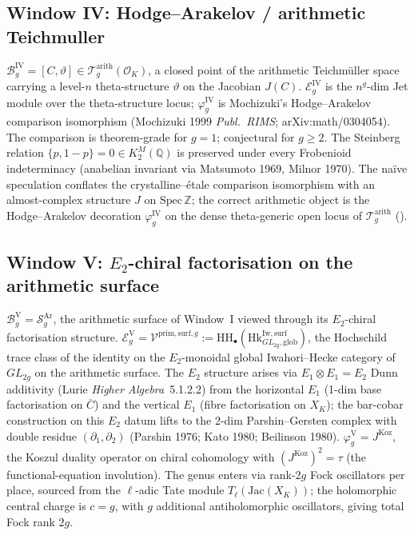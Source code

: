 \subsection{Window IV: Hodge--Arakelov / arithmetic Teichmuller}
\label{v4-arith:ag:w4-mochizuki}

\(\mathcal{B}_g^{\mathrm{IV}}=[C,\vartheta]\in\mathcal{T}_g^{\mathrm{arith}}(\mathcal{O}_K)\),
a closed point of the arithmetic Teichmüller space carrying a level-\(n\)
theta-structure \(\vartheta\) on the Jacobian \(J(C)\). \(\mathcal{E}_g^{\mathrm{IV}}\)
is the \(n^g\)-dim Jet module over the theta-structure locus;
\(\varphi_g^{\mathrm{IV}}\) is Mochizuki's Hodge--Arakelov comparison
isomorphism (Mochizuki 1999 \emph{Publ.~RIMS}; arXiv:math/0304054). The
comparison is theorem-grade for \(g=1\); conjectural for \(g\geq 2\). The
Steinberg relation \(\{p,1-p\}=0\in K_2^M(\mathbb{Q})\) is preserved under
every Frobenioid indeterminacy (anabelian invariant via
Matsumoto 1969, Milnor 1970). The na\"ive speculation conflates the crystalline--\'etale comparison
isomorphism with an almost-complex structure \(J\) on
\(\mathrm{Spec}\,\mathbb{Z}\); the correct arithmetic object is the
Hodge--Arakelov decoration \(\varphi_g^{\mathrm{IV}}\) on the dense
theta-generic open locus of \(\mathcal{T}_g^{\mathrm{arith}}\)
().

\subsection{Window V: \(E_2\)-chiral factorisation on the arithmetic surface}
\label{v4-arith:ag:w5-bar-cobar}

\(\mathcal{B}_g^{\mathrm{V}}=\mathcal{S}_g^{\mathrm{Ar}}\), the arithmetic
surface of Window~I viewed through its \(E_2\)-chiral factorisation
structure. \(\mathcal{E}_g^{\mathrm{V}}=\mathcal{V}^{\mathrm{prim,surf},g}:=
\mathrm{HH}_\bullet(\mathrm{Hk}^{\mathrm{Iw,surf}}_{GL_{2g},\mathrm{glob}})\),
the Hochschild trace class of the identity on the \(E_2\)-monoidal global
Iwahori--Hecke category of \(GL_{2g}\) on the arithmetic surface. The \(E_2\)
structure arises via \(E_1\otimes E_1=E_2\) Dunn additivity (Lurie
\emph{Higher Algebra}~5.1.2.2) from the horizontal \(E_1\) (1-dim base
factorisation on \(\overline{C}\)) and the vertical \(E_1\) (fibre
factorisation on \(X_K\)); the bar-cobar construction on this \(E_2\) datum
lifts to the 2-dim Parshin--Gersten complex with double residue
\((\partial_1,\partial_2)\) (Parshin 1976; Kato 1980; Beilinson 1980).
\(\varphi_g^{\mathrm{V}}=J^{\mathrm{Koz}}\), the Koszul duality operator
on chiral cohomology with \((J^{\mathrm{Koz}})^2=\tau\) (the
functional-equation involution). The genus enters via rank-\(2g\) Fock
oscillators per place, sourced from the \(\ell\)-adic Tate module
\(T_\ell(\mathrm{Jac}(X_K))\); the holomorphic central charge is \(c=g\),
with \(g\) additional antiholomorphic oscillators, giving total Fock
rank \(2g\).

